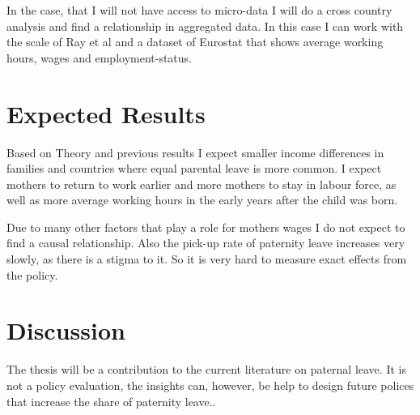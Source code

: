 \documentclass[notitlepage]{report}
\begin{document}
\par In the case, that I will not have access to  micro-data I will do a cross country analysis and find a relationship in aggregated data. In this case I can work with the scale of Ray et al \citeyear{ray2010cares} and  a dataset of Eurostat that shows average  working hours, wages and employment-status. 
\section*{Expected Results}
\par Based on Theory and previous results I expect smaller income differences in families and countries where equal parental leave is more common. I expect mothers to return to work earlier and more mothers to stay in labour force, as well as more average working hours in the early years after the child was born.  
\par Due to many other factors that play a role for mothers wages I do not expect to find a causal relationship. Also the pick-up rate of paternity leave increases very slowly, as there is a stigma to it. So it is very hard to measure exact effects from the policy. 

\section*{Discussion}
\par The thesis will be a contribution to the current literature on paternal leave. It is not a policy evaluation, the insights can, however, be help to design future polices that increase the share of paternity leave..

\nocite{*}


\end{document}
